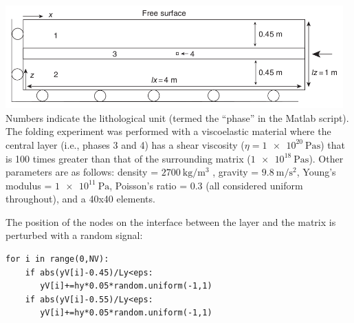 \begin{center}
\includegraphics[width=13cm]{python_codes/fieldstone_129/images/simpson1}\\
{\captionfont  
Numbers indicate the lithological unit (termed the ``phase'' in the Matlab script). 
The folding experiment was
performed with a viscoelastic material where the central layer (i.e., phases 3 and 4) 
has a shear viscosity ($\eta=\SI{1e20}{\pascal\second}$) that
is 100 times greater than that of the surrounding matrix ($\SI{1e18}{\pascal\second}$). 
Other parameters are as follows: 
density = $\SI{2700}{\kg\per\cubic\meter}$ , 
gravity = $\SI{9.8}{\meter\per\square\second}$, 
Young's modulus = $\SI{1e11}{\pascal}$, 
Poisson’s ratio = 0.3 (all considered uniform throughout),
and a 40x40 elements.}
\end{center}

The position of the nodes on the interface between the layer and the matrix is 
perturbed with a random signal:
\begin{lstlisting}
for i in range(0,NV):
    if abs(yV[i]-0.45)/Ly<eps:
       yV[i]+=hy*0.05*random.uniform(-1,1)
    if abs(yV[i]-0.55)/Ly<eps:
       yV[i]+=hy*0.05*random.uniform(-1,1)
\end{lstlisting}


